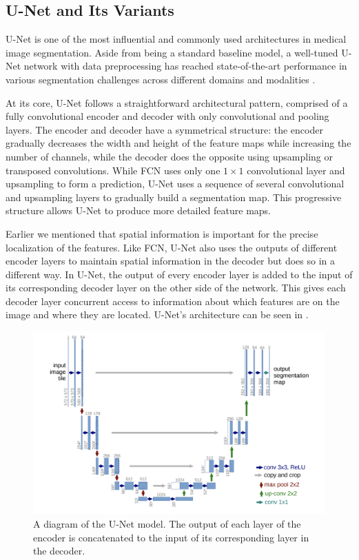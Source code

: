  \subsection{U-Net and Its Variants}

U-Net \cite{ronnebergerUNetConvolutionalNetworks2015d} is one of the most influential and commonly used architectures in medical image segmentation. Aside from being a standard baseline model, a well-tuned U-Net network with data preprocessing has reached state-of-the-art performance in various segmentation challenges across different domains and modalities \cite{isenseeNnUNetSelfconfiguringMethod2021}.

At its core, U-Net follows a straightforward architectural pattern, comprised of a fully convolutional encoder and decoder with only convolutional and pooling layers. The encoder and decoder have a symmetrical structure: the encoder gradually decreases the width and height of the feature maps while increasing the number of channels, while the decoder does the opposite using upsampling or transposed convolutions. While FCN uses only one $1 \times 1$ convolutional layer and upsampling to form a prediction, U-Net uses a sequence of several convolutional and upsampling layers to gradually build a segmentation map. This progressive structure allows U-Net to produce more detailed feature maps.

Earlier we mentioned that spatial information is important for the precise localization of the features. Like FCN, U-Net also uses the outputs of different encoder layers to maintain spatial information in the decoder but does so in a different way. In U-Net, the output of every encoder layer is added to the input of its corresponding decoder layer on the other side of the network. This gives each decoder layer concurrent access to information about which features are on the image and where they are located. U-Net's architecture can be seen in .

\begin{figure}[t!]
 \centering
 \includegraphics[width=0.8\linewidth]{images/unet-arch}
 \caption{A diagram of the U-Net model. The output of each layer of the encoder is concatenated to the input of its corresponding layer in the decoder. \cite{ronnebergerUNetConvolutionalNetworks2015d}}
 \label{fig:unet-arch}
 \end{figure}


